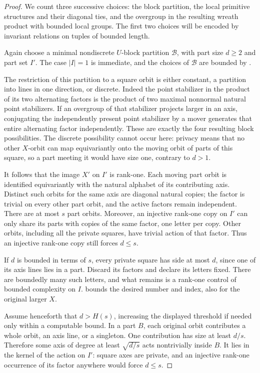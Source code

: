 \begin{proof}
We count three successive choices: the block partition, the local
primitive structures and their diagonal ties, and the overgroup in the
resulting wreath product with bounded local groups.  The first two
choices will be encoded by
invariant relations on tuples of bounded length.

Again choose a minimal nondiscrete $U$-block partition $\mathcal B$,
with part size $d\ge2$ and part set $I'$.  The case $|I|=1$ is
immediate, and the choices of $\mathcal B$ are bounded by
.

The restriction of this partition to a square orbit is either
constant, a partition into lines in one direction, or discrete.
Indeed the point stabilizer in the product of its two alternating
factors is the product of two maximal nonnormal natural point
stabilizers.  If an overgroup of that stabilizer projects larger
in an axis, conjugating the independently present point
stabilizer by a mover generates that entire alternating factor
independently.  These are exactly the four resulting block
possibilities.  The discrete possibility cannot occur here:
privacy means that no other $X$-orbit can map equivariantly onto
the moving orbit of parts of this square, so a part meeting it
would have size one, contrary to $d>1$.

It follows that the image $X'$ on $I'$ is rank-one.  Each moving
part orbit is identified equivariantly with the natural alphabet
of its contributing axis.  Distinct such orbits for the same
axis are diagonal natural copies; the factor is trivial on
every other part orbit, and the active factors remain independent.
There are at most $s$ part orbits.  Moreover, an injective
rank-one copy on $I'$ can only share its parts with copies of
the same factor, one letter per copy.  Other orbits, including
all the private squares, have trivial action of that factor.
Thus an injective rank-one copy still forces $d\le s$.

If $d$ is bounded in terms of $s$, every private square has side
at most $d$, since one of its axis lines lies in a part.  Discard
its factors and declare its letters fixed.  There are boundedly
many such letters, and what remains is a rank-one control of
bounded complexity on $I$.   bounds the desired
number and index, also for the original larger $X$.

Assume henceforth that $d>H(s)$, increasing the displayed
threshold if needed only within a computable bound.  In a part
$B$, each original orbit contributes a whole orbit, an axis
line, or a singleton.  One contribution has size at least
$d/s$.  Therefore some axis of degree at least
$\sqrt{d/s}$ acts nontrivially inside $B$.  It lies in the
kernel of the action on $I'$: square axes are private, and an
injective rank-one occurrence of its factor anywhere would
force $d\le s$.


\end{proof}
